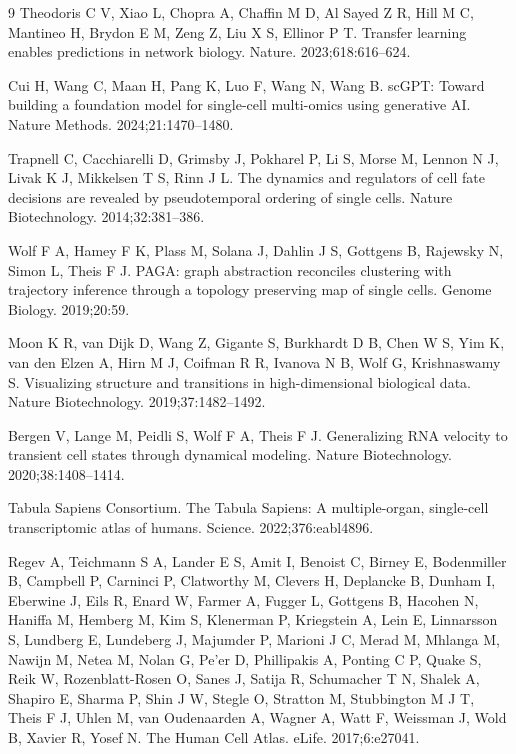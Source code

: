 \documentclass[preprint,12pt,number]{elsarticle}
\begin{document}
\begin{thebibliography}{9}
Theodoris C V, Xiao L, Chopra A, Chaffin M D, Al Sayed Z R, Hill M C, Mantineo H, Brydon E M, Zeng Z, Liu X S, Ellinor P T. Transfer learning enables predictions in network biology. Nature. 2023;618:616--624.

Cui H, Wang C, Maan H, Pang K, Luo F, Wang N, Wang B. scGPT: Toward building a foundation model for single-cell multi-omics using generative AI. Nature Methods. 2024;21:1470--1480.

Trapnell C, Cacchiarelli D, Grimsby J, Pokharel P, Li S, Morse M, Lennon N J, Livak K J, Mikkelsen T S, Rinn J L. The dynamics and regulators of cell fate decisions are revealed by pseudotemporal ordering of single cells. Nature Biotechnology. 2014;32:381--386.

Wolf F A, Hamey F K, Plass M, Solana J, Dahlin J S, Gottgens B, Rajewsky N, Simon L, Theis F J. PAGA: graph abstraction reconciles clustering with trajectory inference through a topology preserving map of single cells. Genome Biology. 2019;20:59.

Moon K R, van Dijk D, Wang Z, Gigante S, Burkhardt D B, Chen W S, Yim K, van den Elzen A, Hirn M J, Coifman R R, Ivanova N B, Wolf G, Krishnaswamy S. Visualizing structure and transitions in high-dimensional biological data. Nature Biotechnology. 2019;37:1482--1492.

Bergen V, Lange M, Peidli S, Wolf F A, Theis F J. Generalizing RNA velocity to transient cell states through dynamical modeling. Nature Biotechnology. 2020;38:1408--1414.

Tabula Sapiens Consortium. The Tabula Sapiens: A multiple-organ, single-cell transcriptomic atlas of humans. Science. 2022;376:eabl4896.

Regev A, Teichmann S A, Lander E S, Amit I, Benoist C, Birney E, Bodenmiller B, Campbell P, Carninci P, Clatworthy M, Clevers H, Deplancke B, Dunham I, Eberwine J, Eils R, Enard W, Farmer A, Fugger L, Gottgens B, Hacohen N, Haniffa M, Hemberg M, Kim S, Klenerman P, Kriegstein A, Lein E, Linnarsson S, Lundberg E, Lundeberg J, Majumder P, Marioni J C, Merad M, Mhlanga M, Nawijn M, Netea M, Nolan G, Pe'er D, Phillipakis A, Ponting C P, Quake S, Reik W, Rozenblatt-Rosen O, Sanes J, Satija R, Schumacher T N, Shalek A, Shapiro E, Sharma P, Shin J W, Stegle O, Stratton M, Stubbington M J T, Theis F J, Uhlen M, van Oudenaarden A, Wagner A, Watt F, Weissman J, Wold B, Xavier R, Yosef N. The Human Cell Atlas. eLife. 2017;6:e27041.


\end{thebibliography}
\end{document}
